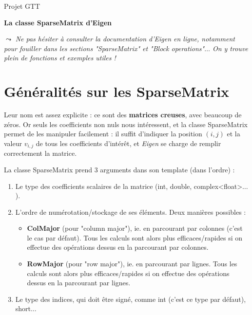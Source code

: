 \documentclass[11pt]{article}
\begin{document}
{\large
{}
\hfill {\sc Projet GTT} \\
}
\vspace{2 mm}

\begin{center}
	\Huge{\textbf{La classe SparseMatrix d'Eigen}}
\end{center}

\vspace{2 mm}

\noindent
\textbf{$\leadsto$} \textit{Ne pas hésiter à consulter la documentation d'Eigen en ligne, notamment pour fouiller dans les sections "SparseMatrix" et "Block operations"$\ldots$ On y trouve plein de fonctions et exemples utiles !}

\vspace{2 mm}

\section{Généralités sur les SparseMatrix}

\noindent
Leur nom est assez explicite : ce sont des \textbf{matrices creuses}, avec beaucoup de zéros. Or seuls les coefficients non nuls nous intéressent, et la classe SparseMatrix permet de les manipuler facilement : il suffit d'indiquer la position $(i,j)$ et la valeur $v_{i,j}$ de tous les coefficients d'intérêt, et \textit{Eigen} se charge de remplir correctement la matrice.

\vspace{5 mm}

\noindent
La classe SparseMatrix prend 3 arguments dans son template (dans l'ordre) :
\begin{enumerate}

	\item Le type des coefficients scalaires de la matrice (int, double, complex<float>$\ldots$).
	
	\item L'ordre de numérotation/stockage de ses éléments. Deux manières possibles :
	
\vspace{1 mm}	
	
	\begin{itemize}
		\item \textbf{ColMajor} (pour "column major"), ie. en parcourant par colonnes (c'est le cas par défaut). Tous les calculs sont alors plus efficaces/rapides si on effectue des opérations dessus en la parcourant par colonnes.
	
\vspace{1 mm}	
	
	\item \textbf{RowMajor} (pour "row major"), ie. en parcourant par lignes. Tous les calculs sont alors plus efficaces/rapides si on effectue des opérations dessus en la parcourant par lignes.
	\end{itemize}
	
	\item Le type des indices, qui doit être signé, comme int (c'est ce type par défaut), short$\ldots$
	
\end{enumerate}
\end{document}
